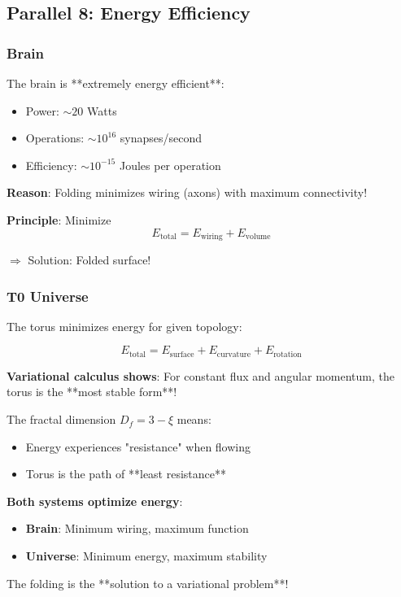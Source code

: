 	\subsection{Parallel 8: Energy Efficiency}
	
	\subsubsection{Brain}
	
	The brain is **extremely energy efficient**:
	
	\begin{itemize}
		\item Power: $\sim 20$ Watts
		\item Operations: $\sim 10^{16}$ synapses/second
		\item Efficiency: $\sim 10^{-15}$ Joules per operation
	\end{itemize}
	
	\textbf{Reason}: Folding minimizes wiring (axons) with maximum connectivity!
	
	\textbf{Principle}: Minimize
	\begin{equation}
		E_{\text{total}} = E_{\text{wiring}} + E_{\text{volume}}
	\end{equation}
	
	$\Rightarrow$ Solution: Folded surface!
	
	\subsubsection{T0 Universe}
	
	The torus minimizes energy for given topology:
	
	\begin{equation}
		E_{\text{total}} = E_{\text{surface}} + E_{\text{curvature}} + E_{\text{rotation}}
	\end{equation}
	
	\textbf{Variational calculus shows}: For constant flux and angular momentum, the torus is the **most stable form**!
	
	The fractal dimension $D_f = 3-\xi$ means:
	\begin{itemize}
		\item Energy experiences "resistance" when flowing
		\item Torus is the path of **least resistance**
	\end{itemize}
	
	\begin{keyresult}
		\textbf{Both systems optimize energy}:
		
		\begin{itemize}
			\item \textbf{Brain}: Minimum wiring, maximum function
			\item \textbf{Universe}: Minimum energy, maximum stability
		\end{itemize}
		
		The folding is the **solution to a variational problem**!
	\end{keyresult}
	
